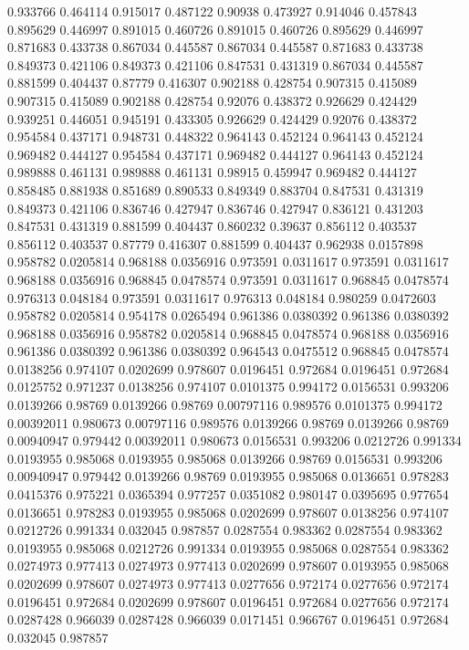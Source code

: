 0.933766 0.464114
0.915017 0.487122
0.90938 0.473927
0.914046 0.457843
0.895629 0.446997
0.891015 0.460726
0.891015 0.460726
0.895629 0.446997
0.871683 0.433738
0.867034 0.445587
0.867034 0.445587
0.871683 0.433738
0.849373 0.421106
0.849373 0.421106
0.847531 0.431319
0.867034 0.445587
0.881599 0.404437
0.87779 0.416307
0.902188 0.428754
0.907315 0.415089
0.907315 0.415089
0.902188 0.428754
0.92076 0.438372
0.926629 0.424429
0.939251 0.446051
0.945191 0.433305
0.926629 0.424429
0.92076 0.438372
0.954584 0.437171
0.948731 0.448322
0.964143 0.452124
0.964143 0.452124
0.969482 0.444127
0.954584 0.437171
0.969482 0.444127
0.964143 0.452124
0.989888 0.461131
0.989888 0.461131
0.98915 0.459947
0.969482 0.444127
0.858485 0.881938
0.851689 0.890533
0.849349 0.883704
0.847531 0.431319
0.849373 0.421106
0.836746 0.427947
0.836746 0.427947
0.836121 0.431203
0.847531 0.431319
0.881599 0.404437
0.860232 0.39637
0.856112 0.403537
0.856112 0.403537
0.87779 0.416307
0.881599 0.404437
0.962938 0.0157898
0.958782 0.0205814
0.968188 0.0356916
0.973591 0.0311617
0.973591 0.0311617
0.968188 0.0356916
0.968845 0.0478574
0.973591 0.0311617
0.968845 0.0478574
0.976313 0.048184
0.973591 0.0311617
0.976313 0.048184
0.980259 0.0472603
0.958782 0.0205814
0.954178 0.0265494
0.961386 0.0380392
0.961386 0.0380392
0.968188 0.0356916
0.958782 0.0205814
0.968845 0.0478574
0.968188 0.0356916
0.961386 0.0380392
0.961386 0.0380392
0.964543 0.0475512
0.968845 0.0478574
0.0138256 0.974107
0.0202699 0.978607
0.0196451 0.972684
0.0196451 0.972684
0.0125752 0.971237
0.0138256 0.974107
0.0101375 0.994172
0.0156531 0.993206
0.0139266 0.98769
0.0139266 0.98769
0.00797116 0.989576
0.0101375 0.994172
0.00392011 0.980673
0.00797116 0.989576
0.0139266 0.98769
0.0139266 0.98769
0.00940947 0.979442
0.00392011 0.980673
0.0156531 0.993206
0.0212726 0.991334
0.0193955 0.985068
0.0193955 0.985068
0.0139266 0.98769
0.0156531 0.993206
0.00940947 0.979442
0.0139266 0.98769
0.0193955 0.985068
0.0136651 0.978283
0.0415376 0.975221
0.0365394 0.977257
0.0351082 0.980147
0.0395695 0.977654
0.0136651 0.978283
0.0193955 0.985068
0.0202699 0.978607
0.0138256 0.974107
0.0212726 0.991334
0.032045 0.987857
0.0287554 0.983362
0.0287554 0.983362
0.0193955 0.985068
0.0212726 0.991334
0.0193955 0.985068
0.0287554 0.983362
0.0274973 0.977413
0.0274973 0.977413
0.0202699 0.978607
0.0193955 0.985068
0.0202699 0.978607
0.0274973 0.977413
0.0277656 0.972174
0.0277656 0.972174
0.0196451 0.972684
0.0202699 0.978607
0.0196451 0.972684
0.0277656 0.972174
0.0287428 0.966039
0.0287428 0.966039
0.0171451 0.966767
0.0196451 0.972684
0.032045 0.987857
